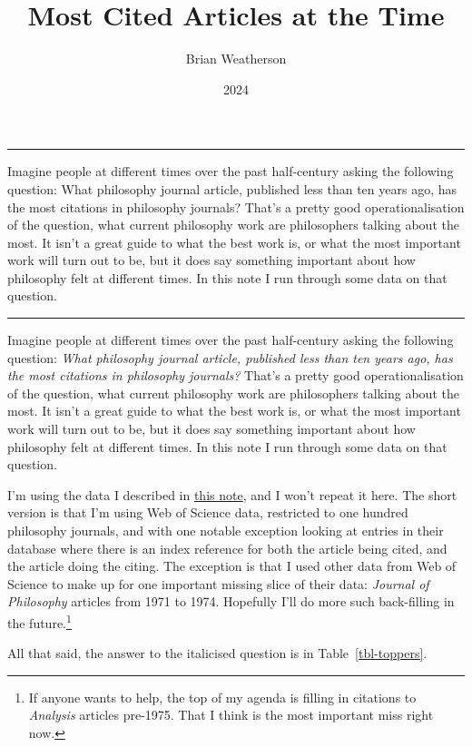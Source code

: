 \documentclass[
  10pt,
  letterpaper,
  DIV=11,
  numbers=noendperiod,
  twoside]{scrartcl}
\title{Most Cited Articles at the Time}
\author{Brian Weatherson}
\date{2024}
\renewenvironment{abstract}
 {\vspace{-1.25cm}
 \quotation\small\noindent\rule{\linewidth}{.5pt}\par\smallskip
 \noindent }
 {\par\noindent\rule{\linewidth}{.5pt}\endquotation}
\begin{document}
\maketitle
\begin{abstract}
Imagine people at different times over the past half-century asking the
following question: What philosophy journal article, published less than
ten years ago, has the most citations in philosophy journals? That's a
pretty good operationalisation of the question, what current philosophy
work are philosophers talking about the most. It isn't a great guide to
what the best work is, or what the most important work will turn out to
be, but it does say something important about how philosophy felt at
different times. In this note I run through some data on that question.
\end{abstract}

Imagine people at different times over the past half-century asking the
following question: \emph{What philosophy journal article, published
less than ten years ago, has the most citations in philosophy journals?}
That's a pretty good operationalisation of the question, what current
philosophy work are philosophers talking about the most. It isn't a
great guide to what the best work is, or what the most important work
will turn out to be, but it does say something important about how
philosophy felt at different times. In this note I run through some data
on that question.

I'm using the data I described in
\href{https://brian.weatherson.org/quarto/posts/citations/raw-data/citations.html}{this
note}, and I won't repeat it here. The short version is that I'm using
Web of Science data, restricted to one hundred philosophy journals, and
with one notable exception looking at entries in their database where
there is an index reference for both the article being cited, and the
article doing the citing. The exception is that I used other data from
Web of Science to make up for one important missing slice of their data:
\emph{Journal of Philosophy} articles from 1971 to 1974. Hopefully I'll
do more such back-filling in the future.\footnote{If anyone wants to
  help, the top of my agenda is filling in citations to \emph{Analysis}
  articles pre-1975. That I think is the most important miss right now.}

All that said, the answer to the italicised question is in
Table~\ref{tbl-toppers}.
\end{document}
